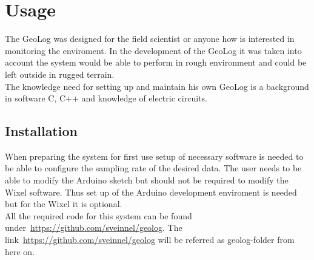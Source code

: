 \section{Usage}
The GeoLog was designed for the field scientist or anyone how is interested in monitoring the enviroment. In the development of the GeoLog it was taken into account the system would be able to perform in rough environment and could be left outside in rugged terrain.\\
The knowledge need for setting up and maintain his own GeoLog is a background in software C, C++ and knowledge of electric circuits. %

\subsection{Installation}
When preparing the system for first use setup of necessary software is needed to be able to configure the sampling rate of the desired data. The user needs to be able to modify the Arduino sketch but should not be required to modify the Wixel software. Thus set up of the Arduino development enviroment is needed but for the Wixel it is optional.\\
All the required code for this system can be found under~\url{https://github.com/sveinnel/geolog}. The link~\url{https://github.com/sveinnel/geolog} will be referred as geolog-folder from here on.\\

